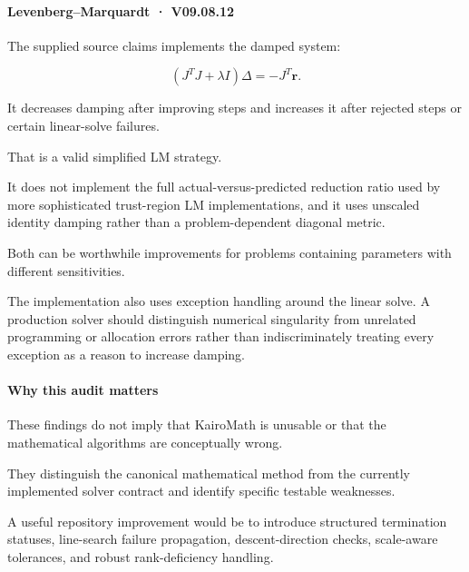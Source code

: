 \paragraph{Levenberg--Marquardt · V09.08.12}\label{02-foundations-ii-ch028-levenbergmarquardt-v09.08.12}

\hypertarget{02-foundations-ii-ch028-levenbergmarquardt-v09.08.12}{}

The supplied source claims  implements the damped system:

\[
(J^TJ+\lambda I)\Delta=-J^T\mathbf r.
\]

It decreases damping after improving steps and increases it after rejected steps or certain linear-solve failures.

That is a valid simplified LM strategy.

It does not implement the full actual-versus-predicted reduction ratio used by more sophisticated trust-region LM implementations, and it uses unscaled identity damping rather than a problem-dependent diagonal metric.

Both can be worthwhile improvements for problems containing parameters with different sensitivities.

The implementation also uses exception handling around the linear solve. A production solver should distinguish numerical singularity from unrelated programming or allocation errors rather than indiscriminately treating every exception as a reason to increase damping.

\paragraph{Why this audit matters}\label{02-foundations-ii-ch028-why-this-audit-matters}

\hypertarget{02-foundations-ii-ch028-why-this-audit-matters}{}

These findings do not imply that KairoMath is unusable or that the mathematical algorithms are conceptually wrong.

They distinguish the canonical mathematical method from the currently implemented solver contract and identify specific testable weaknesses.

A useful repository improvement would be to introduce structured termination statuses, line-search failure propagation, descent-direction checks, scale-aware tolerances, and robust rank-deficiency handling.

